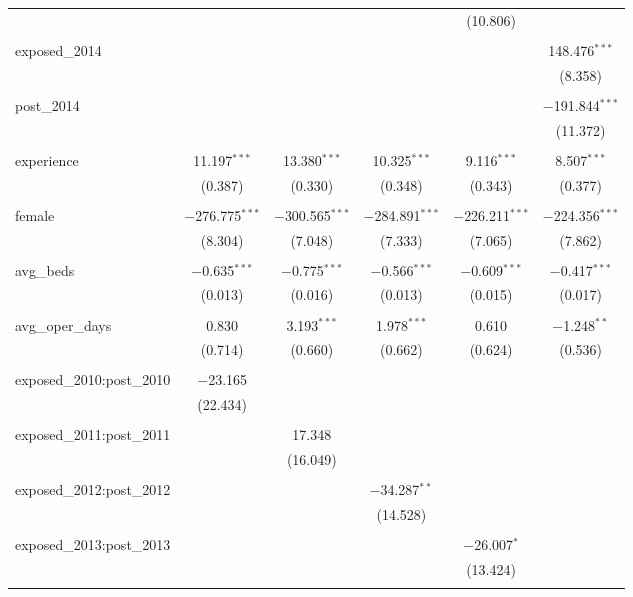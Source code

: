 \begin{table}[!htbp]
\begin{adjustbox}{width=\textwidth}
\begin{tabular}{@{\extracolsep{5pt}}lccccc}
  &  &  &  & (10.806) &  \\ 
  & & & & & \\ 
 exposed\_2014 &  &  &  &  & 148.476$^{***}$ \\ 
  &  &  &  &  & (8.358) \\ 
  & & & & & \\ 
 post\_2014 &  &  &  &  & $-$191.844$^{***}$ \\ 
  &  &  &  &  & (11.372) \\ 
  & & & & & \\ 
 experience & 11.197$^{***}$ & 13.380$^{***}$ & 10.325$^{***}$ & 9.116$^{***}$ & 8.507$^{***}$ \\ 
  & (0.387) & (0.330) & (0.348) & (0.343) & (0.377) \\ 
  & & & & & \\ 
 female & $-$276.775$^{***}$ & $-$300.565$^{***}$ & $-$284.891$^{***}$ & $-$226.211$^{***}$ & $-$224.356$^{***}$ \\ 
  & (8.304) & (7.048) & (7.333) & (7.065) & (7.862) \\ 
  & & & & & \\ 
 avg\_beds & $-$0.635$^{***}$ & $-$0.775$^{***}$ & $-$0.566$^{***}$ & $-$0.609$^{***}$ & $-$0.417$^{***}$ \\ 
  & (0.013) & (0.016) & (0.013) & (0.015) & (0.017) \\ 
  & & & & & \\ 
 avg\_oper\_days & 0.830 & 3.193$^{***}$ & 1.978$^{***}$ & 0.610 & $-$1.248$^{**}$ \\ 
  & (0.714) & (0.660) & (0.662) & (0.624) & (0.536) \\ 
  & & & & & \\ 
 exposed\_2010:post\_2010 & $-$23.165 &  &  &  &  \\ 
  & (22.434) &  &  &  &  \\ 
  & & & & & \\ 
 exposed\_2011:post\_2011 &  & 17.348 &  &  &  \\ 
  &  & (16.049) &  &  &  \\ 
  & & & & & \\ 
 exposed\_2012:post\_2012 &  &  & $-$34.287$^{**}$ &  &  \\ 
  &  &  & (14.528) &  &  \\ 
  & & & & & \\ 
 exposed\_2013:post\_2013 &  &  &  & $-$26.007$^{*}$ &  \\ 
  &  &  &  & (13.424) &  \\ 
  & & & & & \\ 

\end{tabular}
\end{adjustbox}
\end{table}
